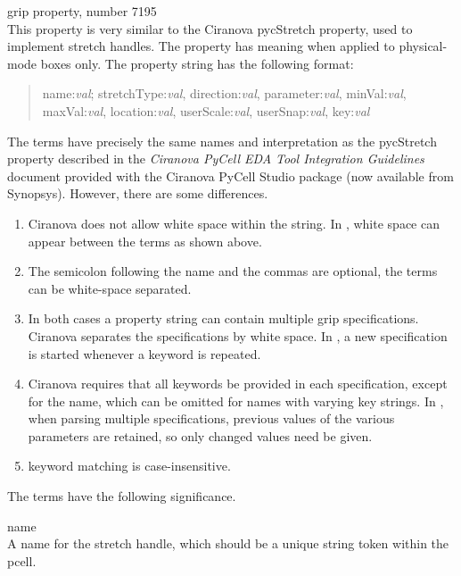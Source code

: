 \begin{description}
\item{\et grip} property, number 7195\\
This property is very similar to the Ciranova {\et pycStretch}
property, used to implement stretch handles.  The property has meaning
when applied to physical-mode boxes only.  The property string has the
following format:

\begin{quote}
{\vt name:}{\it val}{\vt ; stretchType:}{\it val\/}{\vt ,
direction:}{\it val\/}{\vt , parameter:}{\it val\/}{\vt ,
minVal:}{\it val\/}{\vt , maxVal:}{\it val\/}{\vt ,
location:}{\it val\/}{\vt , userScale:}{\it val}{\vt ,
userSnap:}{\it val\/}{\vt , key:}{\it val}
\end{quote}

The terms have precisely the same names and interpretation as the {\et
pycStretch} property described in the {\it Ciranova PyCell EDA Tool
Integration Guidelines} document provided with the Ciranova PyCell
Studio package (now available from Synopsys).  However, there are some
differences.

\begin{enumerate}
\item{Ciranova does not allow white space within the string.  In
{\Xic}, white space can appear between the terms as shown above.}

\item{The semicolon following the name and the commas are optional,
the terms can be white-space separated.}

\item{In both cases a property string can contain multiple grip
specifications.  Ciranova separates the specifications by white space. 
In {\Xic}, a new specification is started whenever a keyword is
repeated.}

\item{Ciranova requires that all keywords be provided in each
specification, except for the name, which can be omitted for names
with varying {\vt key} strings.  In {\Xic}, when parsing multiple
specifications, previous values of the various parameters are
retained, so only changed values need be given.}

\item{{\Xic} keyword matching is case-insensitive.}
\end{enumerate}

The terms have the following significance.
\begin{description}
\item{\vt name}\\
A name for the stretch handle, which should be a unique string token
within the pcell.


\end{description}
\end{description}
